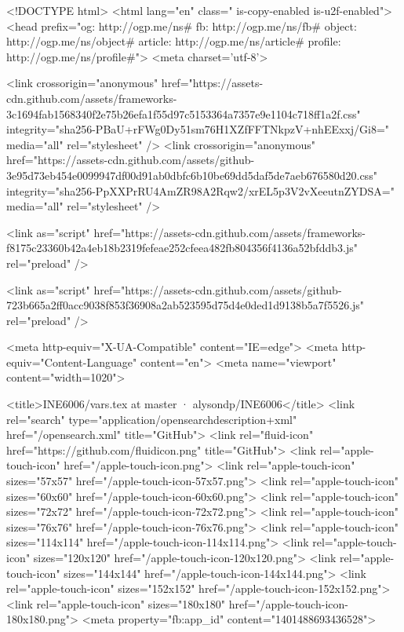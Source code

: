 



<!DOCTYPE html>
<html lang="en" class=" is-copy-enabled is-u2f-enabled">
  <head prefix="og: http://ogp.me/ns# fb: http://ogp.me/ns/fb# object: http://ogp.me/ns/object# article: http://ogp.me/ns/article# profile: http://ogp.me/ns/profile#">
    <meta charset='utf-8'>

    <link crossorigin="anonymous" href="https://assets-cdn.github.com/assets/frameworks-3c1694fab1568340f2e75b26efa1f55d97c5153364a7357e9e1104c718ff1a2f.css" integrity="sha256-PBaU+rFWg0Dy51sm76H1XZfFFTNkpzV+nhEExxj/Gi8=" media="all" rel="stylesheet" />
    <link crossorigin="anonymous" href="https://assets-cdn.github.com/assets/github-3e95d73eb454e0099947df00d91ab0dbfc6b10be69dd5daf5de7aeb676580d20.css" integrity="sha256-PpXXPrRU4AmZR98A2Rqw2/xrEL5p3V2vXeeutnZYDSA=" media="all" rel="stylesheet" />
    
    
    
    

    <link as="script" href="https://assets-cdn.github.com/assets/frameworks-f8175c23360b42a4eb18b2319fefeae252cfeea482fb804356f4136a52bfddb3.js" rel="preload" />
    
    <link as="script" href="https://assets-cdn.github.com/assets/github-723b665a2ff0acc9038f853f36908a2ab523595d75d4e0ded1d9138b5a7f5526.js" rel="preload" />

    <meta http-equiv="X-UA-Compatible" content="IE=edge">
    <meta http-equiv="Content-Language" content="en">
    <meta name="viewport" content="width=1020">
    
    
    <title>INE6006/vars.tex at master · alysondp/INE6006</title>
    <link rel="search" type="application/opensearchdescription+xml" href="/opensearch.xml" title="GitHub">
    <link rel="fluid-icon" href="https://github.com/fluidicon.png" title="GitHub">
    <link rel="apple-touch-icon" href="/apple-touch-icon.png">
    <link rel="apple-touch-icon" sizes="57x57" href="/apple-touch-icon-57x57.png">
    <link rel="apple-touch-icon" sizes="60x60" href="/apple-touch-icon-60x60.png">
    <link rel="apple-touch-icon" sizes="72x72" href="/apple-touch-icon-72x72.png">
    <link rel="apple-touch-icon" sizes="76x76" href="/apple-touch-icon-76x76.png">
    <link rel="apple-touch-icon" sizes="114x114" href="/apple-touch-icon-114x114.png">
    <link rel="apple-touch-icon" sizes="120x120" href="/apple-touch-icon-120x120.png">
    <link rel="apple-touch-icon" sizes="144x144" href="/apple-touch-icon-144x144.png">
    <link rel="apple-touch-icon" sizes="152x152" href="/apple-touch-icon-152x152.png">
    <link rel="apple-touch-icon" sizes="180x180" href="/apple-touch-icon-180x180.png">
    <meta property="fb:app_id" content="1401488693436528">

